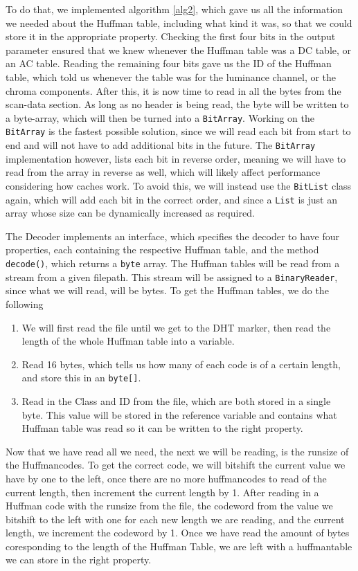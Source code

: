 To do that, we implemented algorithm \ref{alg2}, which gave us all the information we needed about the Huffman table, including what kind it was, so that we could store it in the appropriate property. 
Checking the first four bits in the output parameter ensured that we knew whenever the Huffman table was a DC table, or an AC table. 
Reading the remaining four bits gave us the ID of the Huffman table, which told us whenever the table was for the luminance channel, or the chroma components.
After this, it is now time to read in all the bytes from the scan-data section. As long as no header is being read, the byte will be written to a byte-array, which will then be turned into a \lstinline|BitArray|.
Working on the \lstinline|BitArray| is the fastest possible solution, since we will read each bit from start to end and will not have to add additional bits in the future. The \lstinline|BitArray| implementation however, lists each bit in reverse order, meaning we will have to read from the array in reverse as well, which will likely affect performance considering how caches work.
To avoid this, we will instead use the \lstinline|BitList| class again, which will add each bit in the correct order, and since a \lstinline|List| is just an array whose size can be dynamically increased as required. 

The Decoder implements an interface, which specifies the decoder to have four properties, each containing the respective Huffman table, and the method \lstinline|decode()|, which returns a \lstinline|byte| array. 
The Huffman tables will be read from a stream from a given filepath. This stream will be assigned to a \lstinline|BinaryReader|, since what we will read, will be bytes. 
To get the Huffman tables, we do the following
\begin{enumerate}
\item We will first read the file until we get to the DHT marker, then read the length of the whole Huffman table into a variable.
\item Read 16 bytes, which tells us how many of each code is of a certain length, and store this in an \lstinline|byte[]|.
\item Read in the Class and ID from the file, which are both stored in a single byte. This value will be stored in the reference variable and contains what Huffman table was read so it can be written to the right property.
\end{enumerate}
Now that we have read all we need, the next we will be reading, is the runsize of the Huffmancodes. To get the correct code, we will bitshift the current value we have by one to the left, once there are no more huffmancodes to read of the current length, then increment the current length by 1.
After reading in a Huffman code with the runsize from the file, the codeword from the value we bitshift to the left with one for each new length we are reading, and the current length, we increment the codeword by 1.
Once we have read the amount of bytes coresponding to the length of the Huffman Table, we are left with a huffmantable we can store in the right property.
